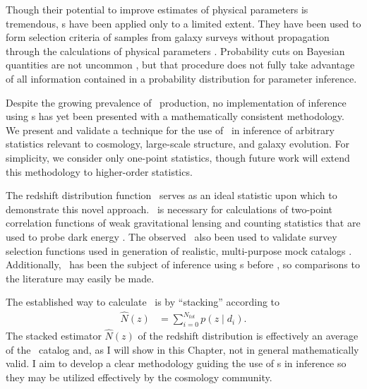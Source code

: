 

Though their potential to improve estimates of physical parameters is tremendous, \pzpdf s have been applied only to a limited extent.  
They have been used to form selection criteria of samples from galaxy surveys without propagation 
through the calculations of physical parameters \citep{VanBreukelen2009,Viironen2015}.  
Probability cuts on Bayesian quantities are not uncommon \citep{Leung2015, DiPompeo2015a}, but that procedure does not fully take advantage of all information contained in a probability distribution for parameter inference.  

Despite the growing prevalence of \pzpdf\ production, no implementation of inference using \pzpdf s has yet been presented with a mathematically consistent methodology.  
We present and validate a technique for the use of \pzpdf\ in inference of arbitrary statistics relevant to cosmology, large-scale structure, and galaxy evolution.  
For simplicity, we consider only one-point statistics, though future work will extend this methodology to higher-order statistics.

The redshift distribution function \Nz\ serves as an ideal statistic upon which to demonstrate this novel approach.  
\Nz\ is necessary for calculations of two-point correlation functions of weak gravitational lensing and counting statistics that are used to probe dark energy \citep{Masters2015}.  
The observed \Nz\ also been used to validate survey selection functions used in generation of realistic, multi-purpose mock catalogs \citep{Norberg2002}.  
Additionally, \Nz\ has been the subject of inference using \pzpdf s before \citep{Sheldon2012, Hildebrandt2012, Kelly2014, Benjamin2013, Bonnett2015a, Viironen2015, Asorey2016, Leistedt2016}, so comparisons to the literature may easily be made. 

The established way to calculate \Nz\ is by ``stacking'' according to
\begin{align}
\label{eq:stackwithdata}
\hat{N}(z) &= \sum_{i = 0}^{N_{tot}} p(z \mid d_{i}) .
\end{align}
The stacked estimator $\hat{N}(z)$ of the redshift distribution is effectively an average of the \pzpdf\ catalog and, as I will show in this Chapter, not in general mathematically valid.
I aim to develop a clear methodology guiding the use of \pzpdf s in inference so they may be utilized effectively by the cosmology community.


